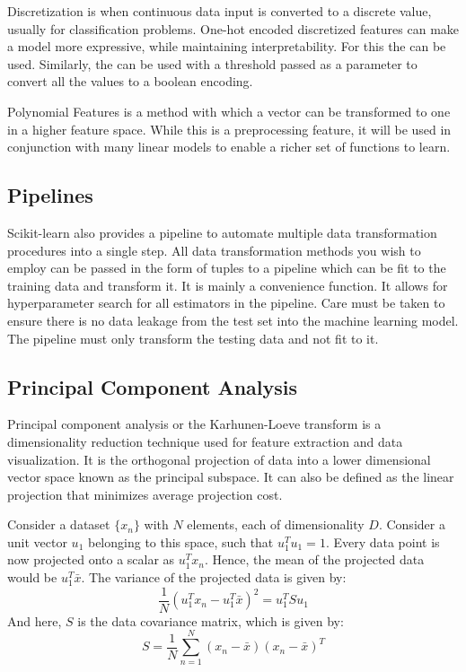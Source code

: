 \documentclass{article}
\newcommand{\code}[1]{{\fontfamily{zi4} \selectfont{#1}}}
\begin{document}
Discretization is when continuous data input is converted to a discrete value, usually for classification problems. One-hot encoded discretized features can make a model more expressive, while maintaining interpretability. For this the \code{sklearn.preprocessing.KBinsDiscretizer} can be used. Similarly, the \code{Binarizer} can be used with a threshold passed as a parameter to convert all the values to a boolean encoding.

Polynomial Features is a method with which a vector can be transformed to one in a higher feature space. While this is a preprocessing feature, it will be used in conjunction with many linear models to enable a richer set of functions to learn.

\subsection{Pipelines}
Scikit-learn also provides a pipeline to automate multiple data transformation procedures into a single step. All data transformation methods you wish to employ can be passed in the form of tuples to a pipeline which can be fit to the training data and transform it. It is mainly a convenience function. It allows for hyperparameter search for all estimators in the pipeline. Care must be taken to ensure there is no data leakage from the test set into the machine learning model. The pipeline must only transform the testing data and not fit to it.

\subsection{Principal Component Analysis}
\label{pca}
Principal component analysis or the Karhunen-Loeve transform is a dimensionality reduction technique used for feature extraction and data visualization. It is the orthogonal projection of data into a lower dimensional vector space known as the principal subspace. It can also be defined as the linear projection that minimizes average projection cost. 

Consider a dataset $\{x_n\}$ with $N$ elements, each of dimensionality $D$. Consider a unit vector $u_1$ belonging to this space, such that $u_1^T u_1=1$. Every data point is now projected onto a scalar as $u_1^T x_n$. Hence, the mean of the projected data would be $u_1^T \bar{x}$. The variance of the projected data is given by:
$$\frac{1}{N} \left( u_1^T x_n - u_1^T \bar{x} \right)^2 = u_1^T S u_1$$
And here, $S$ is the data covariance matrix, which is given by:
$$S = \frac{1}{N} \sum_{n=1}^N (x_n-\bar{x})(x_n-\bar{x})^T$$
\end{document}
